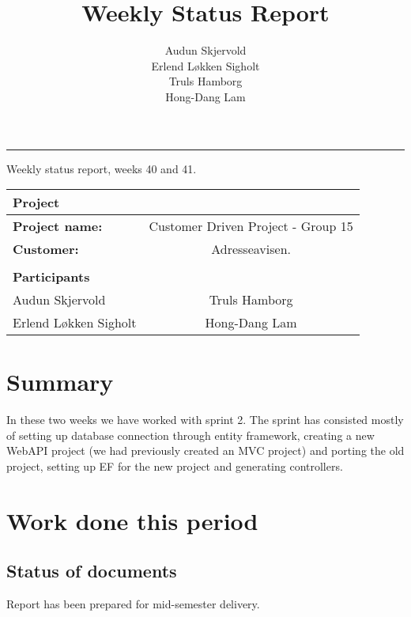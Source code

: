 \documentclass[12pt, a4paper]{article}
\title{Weekly Status Report}
\author{Audun Skjervold \\ Erlend Løkken Sigholt \\ Truls Hamborg \\ Hong-Dang Lam}
\begin{document}
\maketitle
\newpage

 
\newpage
\hrule
\newpage

\begin{center}
Weekly status report, weeks 40 and 41.
  \begin{tabular}{| l  c |}
    \hline
    Project & \\ \hline
    \textbf{Project name:} & Customer Driven Project - Group 15 \\
    \textbf{Customer:} & Adresseavisen. \\ \hline
     & \\
     \textbf{Participants} & \\ \hline
     Audun Skjervold & Truls Hamborg \\
     Erlend Løkken Sigholt & Hong-Dang Lam \\
    \hline
  \end{tabular}
  \end{center}




\section{Summary}
In these two weeks we have worked with sprint 2. The sprint has consisted mostly of setting up database connection through entity framework, creating a new WebAPI project (we had previously created an MVC project) and porting the old project, setting up EF for the new project and generating controllers.

\section{Work done this period}
\subsection{Status of documents}
Report has been prepared for mid-semester delivery.
\end{document}
